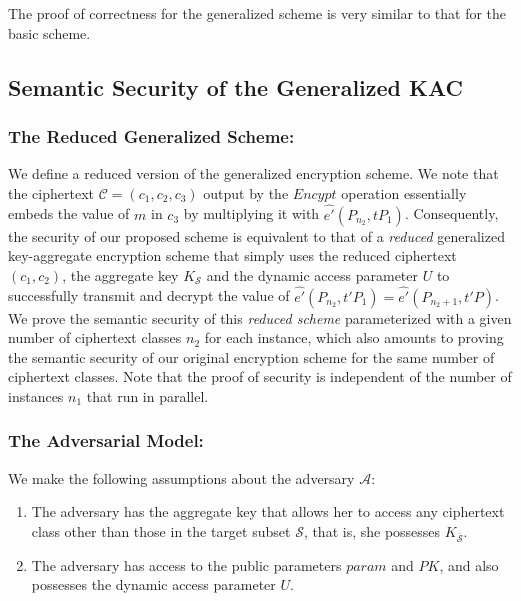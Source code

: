 The proof of correctness for the generalized scheme is very similar to that for the basic scheme.

\subsection{Semantic Security of the Generalized KAC}
\label{subsec:proof_general}

\subsubsection{The Reduced Generalized Scheme:}

We define a reduced version of the generalized encryption scheme. We note that the ciphertext $\mathcal{C}=(c_1,c_2,c_3)$ output by the $Encypt$ operation essentially embeds the value of $m$ in $c_3$ by multiplying it with $\hat{e'}(P_{n_2},tP_1)$. Consequently, the security of our proposed scheme is equivalent to that of a \emph{reduced} generalized key-aggregate encryption scheme that simply uses the reduced ciphertext $(c_1,c_2)$, the aggregate key $K_{\mathcal{S}}$ and the dynamic access parameter $U$ to successfully transmit and decrypt the value of $\hat{e'}(P_{n_2},t'P_1)=\hat{e'}(P_{n_2+1},t'P)$. We prove the semantic security of this \emph{reduced scheme} parameterized with a given number of ciphertext classes $n_2$ for each instance, which also amounts to proving the semantic security of our original encryption scheme for the same number of ciphertext classes. Note that the proof of security is independent of the number of instances $n_1$ that run in parallel.

\subsubsection{The Adversarial Model:} We make the following assumptions about the adversary $\mathcal{A}$:

\begin{enumerate}
 \item The adversary has the aggregate key that allows her to access any ciphertext class other than those in the target subset $\mathcal{S}$, that is, she possesses $K_{\overline{\mathcal{S}}}$.
 \item The adversary has access to the public parameters $param$ and $PK$, and also possesses the dynamic access parameter $U$.
\end{enumerate}


